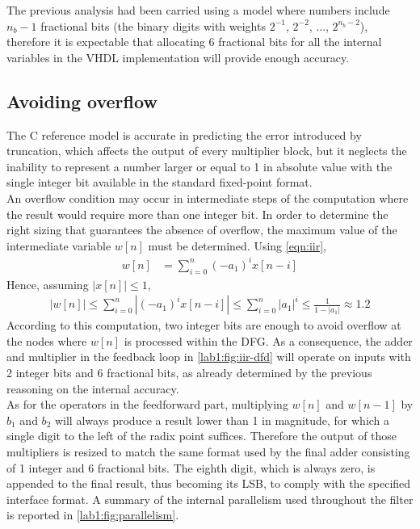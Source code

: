 The previous analysis had been carried using a model where numbers include $n_b-1$ fractional bits (the binary digits with weights $2^{-1}$, $2^{-2}$, ..., $2^{n_b-2}$), therefore it is expectable that allocating 6 fractional bits for all the internal variables in the VHDL implementation will provide enough accuracy.

\subsection{Avoiding overflow}
The C reference model is accurate in predicting the error introduced by truncation, which affects the output of every multiplier block, but it neglects the inability to represent a number larger or equal to 1 in absolute value with the single integer bit available in the standard fixed-point format.\\
An overflow condition may occur in intermediate steps of the computation where the result would require more than one integer bit. In order to determine the right sizing that guarantees the absence of overflow, the maximum value of the intermediate variable $w[n]$ must be determined. Using \autoref{eqn:iir},
\begin{align*}
	w[n] &= \sum_{i=0}^{n} (-a_1)^i x[n-i]
\end{align*}
Hence, assuming $|x[n]|\leq 1$,
\begin{align*}
	|w[n]|\leq
	\sum_{i=0}^{n} |(-a_1)^i x[n-i]| \leq
	\sum_{i=0}^{n} |a_1|^i \leq
	\frac{1}{1-|a_1|} \approx
	1.2
\end{align*}
According to this computation, two integer bits are enough to avoid overflow at the nodes where $w[n]$ is processed within the DFG. As a consequence, the adder and multiplier in the feedback loop in \autoref{lab1:fig:iir-dfd} will operate on inputs with 2 integer bits and 6 fractional bits, as already determined by the previous reasoning on the internal accuracy.\\
As for the operators in the feedforward part, multiplying $w[n]$ and $w[n-1]$ by $b_1$ and $b_2$ will always produce a result lower than 1 in magnitude, for which a single digit to the left of the radix point suffices. Therefore the output of those multipliers is resized to match the same format used by the final adder consisting of 1 integer and 6 fractional bits. The eighth digit, which is always zero, is appended to the final result, thus becoming its LSB, to comply with the specified interface format. A summary of the internal parallelism used throughout the filter is reported in \autoref{lab1:fig:parallelism}.
